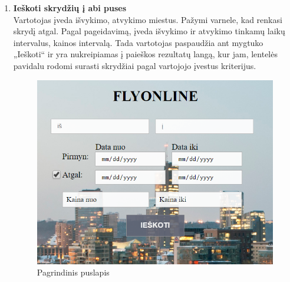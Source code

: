 \documentclass{VUMIFPSkursinis}
\begin{document}
\begin{enumerate}[label=\textbf{U\arabic*}.]
                    \item \textbf{Ieškoti skrydžių į abi puses}\\
                    Vartotojas įveda išvykimo, atvykimo miestus. Pažymi varnele, kad renkasi skrydį atgal. Pagal pageidavimą, įveda išvykimo ir atvykimo tinkamų laikų intervalus, kainos intervalą. Tada vartotojas paspaudžia ant mygtuko „Ieškoti“ ir yra nukreipiamas į paieškos rezultatų langą, kur jam, lentelės pavidalu rodomi surasti skrydžiai pagal vartojojo įvestus kriterijus.
                    \begin{figure}[H]
                        \centering
                        \includegraphics[scale=0.8]{img/bothways}
                        \caption{Pagrindinis puslapis}
                        \label{Pagrindinis puslapis}
                    \end{figure}
    

\end{enumerate}
\end{document}
